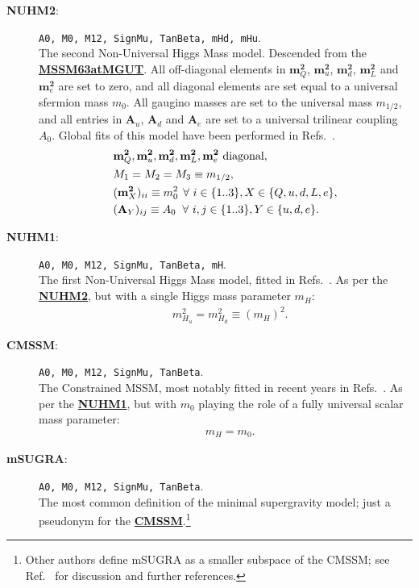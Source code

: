 \documentclass[pdftex,twocolumn,epjc3_preprint,runningheads]{svjour3}
\renewcommand{\_}{\discretionary{\underscore}{}{\underscore}}
\newcommand\term[1]{{\lstset{style=terminal}\lstinline!#1!\lstset{style=cpp}}}
\newcommand{\doublecrosssf}[2]{\hyperref[#2]{\textbf{\textsf{#1}}}}
\newcommand{\gsfitemc}[1]{\item[\textbf{\textsf{#1}}\label{#1}:]}
\begin{document}
\begin{description}
\gsfitemc{NUHM2} \term{A0, M0, M12, SignMu, TanBeta, mHd, mHu}.\\
The second Non-Universal Higgs Mass model. Descended from the \doublecrosssf{MSSM63atMGUT}{MSSM63atMGUT}.  All off-diagonal elements in $\mathbf{m}^\mathbf{2}_Q$, $\mathbf{m}^\mathbf{2}_u$, $\mathbf{m}^\mathbf{2}_d$, $\mathbf{m}^\mathbf{2}_L$ and $\mathbf{m}^\mathbf{2}_e$ are set to zero, and all diagonal elements are set equal to a universal sfermion mass $m_0$.  All gaugino masses are set to the universal mass $m_{1/2}$, and all entries in $\mathbf{A}_u$, $\mathbf{A}_d$ and $\mathbf{A}_e$ are set to a universal trilinear coupling $A_0$.  Global fits of this model have been performed in Refs.\ \cite{arXiv:1405.4289,Buchmueller:2014yva,CMSSM}.
\begin{align}
&\mathbf{m}^\mathbf{2}_Q, \mathbf{m}^\mathbf{2}_u, \mathbf{m}^\mathbf{2}_d, \mathbf{m}^\mathbf{2}_L, \mathbf{m}^\mathbf{2}_e\ \mathrm{diagonal},\\
&M_1 = M_2 = M_3 \equiv m_{1/2},\\
&(\mathbf{m}^\mathbf{2}_X)_{ii} \equiv m_0^2\hspace{1.5mm} \forall\ i\in\{1..3\}, X\in\{Q,u,d,L,e\},\\
&(\mathbf{A}_Y)_{ij} \equiv A_0\hspace{2mm} \forall\ i,j\in\{1..3\}, Y\in\{u,d,e\}.
\end{align}

\gsfitemc{NUHM1} \term{A0, M0, M12, SignMu, TanBeta, mH}.\\
The first Non-Universal Higgs Mass model, fitted in Refs.\ \cite{Buchmueller09,Mastercode12b,Strege13,MastercodeCMSSM,CMSSM}. As per the \doublecrosssf{NUHM2}{NUHM2}, but with a single Higgs mass parameter $m_H$:
\begin{align}
&m^2_{H_u} = m^2_{H_d} \equiv (m_H)^2.
\end{align}

\gsfitemc{CMSSM} \term{A0, M0, M12, SignMu, TanBeta}.\\
The Constrained MSSM, most notably fitted in recent years in Refs.\ \cite{Fittinocoverage,MastercodeCMSSM,Han:2016gvr,CMSSM}. As per the \doublecrosssf{NUHM1}{NUHM1}, but with $m_0$ playing the role of a fully universal scalar mass parameter:
\begin{align}
&m_H = m_0.
\end{align}

\gsfitemc{mSUGRA} \term{A0, M0, M12, SignMu, TanBeta}.\\
The most common definition of the minimal supergravity model; just a pseudonym for the \doublecrosssf{CMSSM}{CMSSM}.\footnote{Other authors define mSUGRA as a smaller subspace of the CMSSM; see Ref.\ \cite{Dudas:2012hx} for discussion and further references.}\vspace{2mm}

\end{description}
\end{document}
